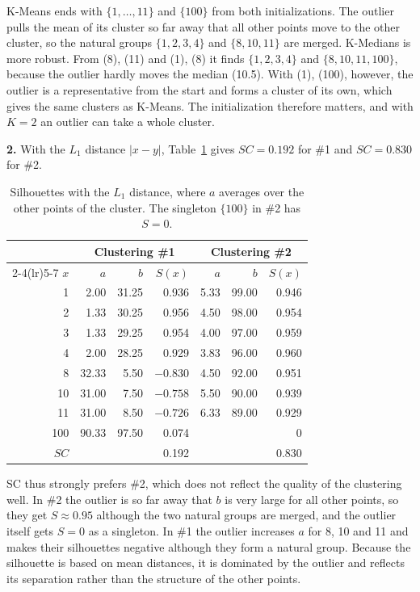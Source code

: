 \documentclass[a4paper,12pt]{article}
\begin{document}
K-Means ends with $\{1,\dots,11\}$ and $\{100\}$ from both initializations.
The outlier pulls the mean of its cluster so far away that all other points
move to the other cluster, so the natural groups $\{1,2,3,4\}$ and
$\{8,10,11\}$ are merged. K-Medians is more robust. From (8), (11) and
(1), (8) it finds $\{1,2,3,4\}$ and $\{8,10,11,100\}$, because the outlier
hardly moves the median (10.5). With (1), (100), however, the outlier is a
representative from the start and forms a cluster of its own, which gives
the same clusters as K-Means. The initialization therefore matters, and with
$K=2$ an outlier can take a whole cluster.

\textbf{2.} With the $L_1$ distance $|x-y|$, Table~\ref{tab:silhouette}
gives $SC=0.192$ for \#1 and $SC=0.830$ for \#2.

\begin{table}[!ht]
\centering
\caption{Silhouettes with the $L_1$ distance, where $a$ averages over the
  other points of the cluster. The singleton $\{100\}$ in \#2 has $S=0$.}
\label{tab:silhouette}
\begin{tabular}{rrrrrrr}
\toprule
 & \multicolumn{3}{c}{Clustering \#1} & \multicolumn{3}{c}{Clustering \#2} \\
\cmidrule(lr){2-4}\cmidrule(lr){5-7}
$x$ & $a$ & $b$ & $S(x)$ & $a$ & $b$ & $S(x)$ \\
\midrule
1 & 2.00 & 31.25 & 0.936 & 5.33 & 99.00 & 0.946 \\
2 & 1.33 & 30.25 & 0.956 & 4.50 & 98.00 & 0.954 \\
3 & 1.33 & 29.25 & 0.954 & 4.00 & 97.00 & 0.959 \\
4 & 2.00 & 28.25 & 0.929 & 3.83 & 96.00 & 0.960 \\
8 & 32.33 & 5.50 & $-0.830$ & 4.50 & 92.00 & 0.951 \\
10 & 31.00 & 7.50 & $-0.758$ & 5.50 & 90.00 & 0.939 \\
11 & 31.00 & 8.50 & $-0.726$ & 6.33 & 89.00 & 0.929 \\
100 & 90.33 & 97.50 & 0.074 & & & 0 \\
\midrule
$SC$ & & & 0.192 & & & 0.830 \\
\bottomrule
\end{tabular}
\end{table}

SC thus strongly prefers \#2, which does not reflect the quality of the
clustering well. In \#2 the outlier is so far away that $b$ is very large
for all other points, so they get $S\approx0.95$ although the two natural
groups are merged, and the outlier itself gets $S=0$ as a singleton. In \#1
the outlier increases $a$ for 8, 10 and 11 and makes their silhouettes
negative although they form a natural group. Because the silhouette is
based on mean distances, it is dominated by the outlier and reflects its
separation rather than the structure of the other points.
\end{document}
